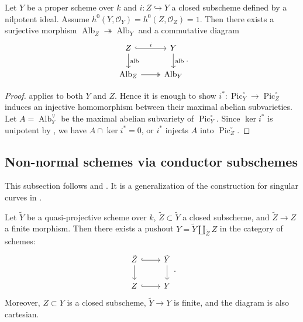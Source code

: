 \documentclass[reqno, letterpaper]{amsart}
\numberwithin{equation}{subsection}
\let\to\longrightarrow
\DeclareMathOperator{\Pic}{Pic}
\DeclareMathOperator{\Alb}{Alb}
\DeclareMathOperator{\alb}{alb}
\begin{document}
		\begin{corollary} \label{cor:Albanese}
			Let $Y$ be a proper scheme over $k$ and $i : Z \hookrightarrow Y$ a closed subscheme defined by a nilpotent ideal. Assume $h^0 (Y, \mathcal O_Y) = h^0 (Z, \mathcal O_Z) = 1$. Then there exists a surjective morphism $\Alb_Z \twoheadrightarrow \Alb_Y$ and a commutative diagram
			\[\begin{tikzcd}
				Z \arrow[r, hook, "i"] \arrow[d, "\alb"] & Y \arrow[d, "\alb"] \\
				\Alb_Z \arrow[r, twoheadrightarrow] & \Alb_Y
			\end{tikzcd}.\]
		\end{corollary}
		\begin{proof}
			 applies to both $Y$ and $Z$. Hence it is enough to show $i^* : \Pic^\circ_Y \to \Pic^\circ_Z$ induces an injective homomorphism between their maximal abelian subvarieties. Let $A = \Alb_Y^\vee$ be the maximal abelian subvariety of $\Pic^\circ_Y$. Since $\ker i^*$ is unipotent by , we have $A \cap \ker i^* = 0$, or $i^*$ injects $A$ into $\Pic^\circ_Z$.
		\end{proof}
		
		
		
	\subsection{Non-normal schemes via conductor subschemes} \label{sec:conductor}
		This subsection follows \cite[Tag~0ECH]{stacks-project} and \cite{sch12}. It is a generalization of the construction for singular curves in \cite[\S IV.1]{serre:class_field}.
		
		\begin{proposition} \label{prop:pushout}
			Let $\tilde Y$ be a quasi-projective scheme over $k$, $\tilde Z \subset \tilde Y$ a closed subscheme, and $\tilde Z \to Z$ a finite morphism. Then there exists a pushout $Y = \tilde Y \amalg_{\tilde Z} Z$ in the category of schemes:
			\begin{equation} \label{diag:pushout}
			\begin{tikzcd}
				\tilde Z \arrow[r, hook] \arrow[d] & \tilde Y \arrow[d] \\
				Z \arrow[r, hook] & Y
			\end{tikzcd} .
			\end{equation}
			Moreover, $Z \subset Y$ is a closed subscheme, $\tilde Y \to Y$ is finite, and the diagram is also cartesian.
		\end{proposition}
		
\end{document}
